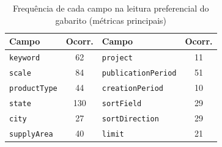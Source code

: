 \begin{table}[htbp!]
\centering
\caption{Frequência de cada campo na leitura preferencial do gabarito (métricas principais)}
\label{tab:dataset-campos}
\small
\begin{tabular}{|l|c||l|c|}
\hline
\textbf{Campo} & \textbf{Ocorr.} & \textbf{Campo} & \textbf{Ocorr.} \\
\hline
\texttt{keyword} & 62 & \texttt{project} & 11 \\
\texttt{scale} & 84 & \texttt{publicationPeriod} & 51 \\
\texttt{productType} & 44 & \texttt{creationPeriod} & 10 \\
\texttt{state} & 130 & \texttt{sortField} & 29 \\
\texttt{city} & 27 & \texttt{sortDirection} & 29 \\
\texttt{supplyArea} & 40 & \texttt{limit} & 21 \\
\hline
\end{tabular}
\end{table}
